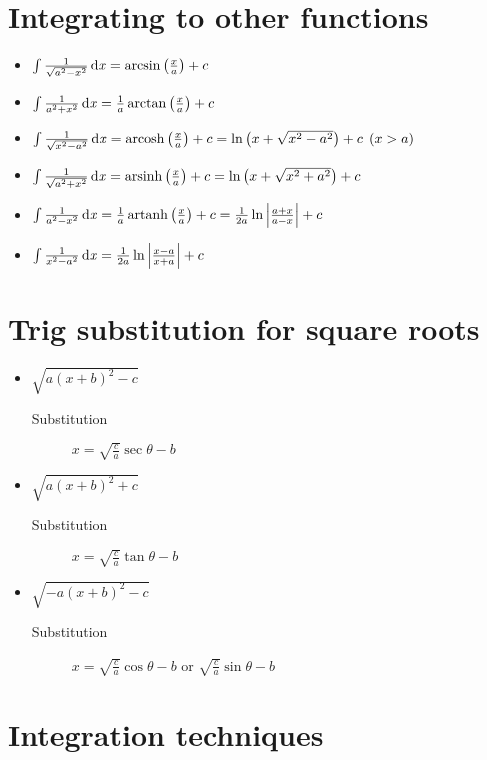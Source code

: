 \section{Integrating to other functions}
\begin{itemize}
    \item $\int \frac{1}{\sqrt{a^2-x^2}} \operatorname{\mathrm{d}\mathit{x}}=\arcsin \left(\frac{x}{a}\right) + c $
    \item $\int \frac{1}{a^2+x^2} \operatorname{\mathrm{d}\mathit{x}}= \frac{1}{a}\arctan \left(\frac{x}{a}\right) + c $
    \item $\int \frac{1}{\sqrt{x^2-a^2}} \operatorname{\mathrm{d}\mathit{x}}= \operatorname{arcosh} \left(\frac{x}{a}\right) + c = \ln \left(x + \sqrt{x^2-a^2}\right) + c \:\:  (x>a)$
    \item $\int \frac{1}{\sqrt{a^2+x^2}} \operatorname{\mathrm{d}\mathit{x}}= \operatorname{arsinh} \left(\frac{x}{a}\right) + c = \ln \left(x + \sqrt{x^2+a^2}\right) + c $
    \item $\int \frac{1}{a^2-x^2} \operatorname{\mathrm{d}\mathit{x}}=\frac{1}{a}\operatorname{artanh} \left(\frac{x}{a}\right) + c = \frac{1}{2a}\ln \left|\frac{a+x}{a-x}\right| + c$
    \item $\int \frac{1}{x^2-a^2} \operatorname{\mathrm{d}\mathit{x}}= \frac{1}{2a}\ln \left|\frac{x-a}{x+a}\right| + c$
\end{itemize}

\section{Trig substitution for square roots}
\begin{itemize}
    \item $\sqrt{a(x+b)^2-c}$
    \begin{description}
        \item[Substitution] $x = \sqrt{\frac{c}{a}}\sec\theta - b$
    \end{description}
    \item $\sqrt{a(x+b)^2+c}$
    \begin{description}
        \item[Substitution] $x = \sqrt{\frac{c}{a}}\tan\theta - b$
    \end{description}
    \item $\sqrt{-a(x+b)^2-c}$
    \begin{description}
        \item[Substitution] $x = \sqrt{\frac{c}{a}}\cos\theta - b$ or $\sqrt{\frac{c}{a}}\sin\theta - b$
    \end{description}
\end{itemize}

\section{Integration techniques}
